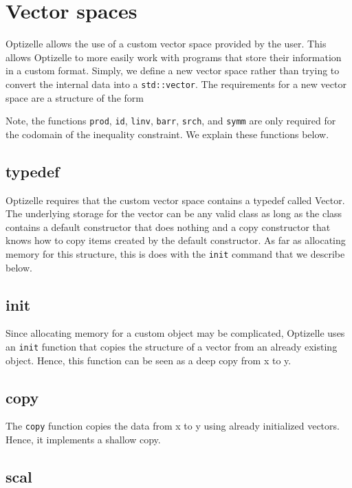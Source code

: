 \documentclass{report}
\newcommand{\seccustomvector}{Vector spaces}
\begin{document}
\section{\seccustomvector}\label{sec:customvector}

        Optizelle allows the use of a custom vector space provided by the user.  This allows Optizelle to more easily work with programs that store their information in a custom format.  Simply, we define a new vector space rather than trying to convert the internal data into a \texttt{std::vector}.  The requirements for a new vector space are a structure of the form

Note, the functions \texttt{prod}, \texttt{id}, \texttt{linv}, \texttt{barr}, \texttt{srch}, and \texttt{symm} are only required for the codomain of the inequality constraint.  We explain these functions below.

\subsection{typedef}

       Optizelle requires that the custom vector space contains a typedef called Vector.  The underlying storage for the vector can be any valid class as long as the class contains a default constructor that does nothing and a copy constructor that knows how to copy items created by the default constructor.  As far as allocating memory for this structure, this is does with the \texttt{init} command that we describe below.

\subsection{init}

        Since allocating memory for a custom object may be complicated, Optizelle uses an \texttt{init} function that copies the structure of a vector from an already existing object.  Hence, this function can be seen as a deep copy from x to y.

\subsection{copy}
        
        The \texttt{copy} function copies the data from x to y using already initialized vectors.  Hence, it implements a shallow copy.

\subsection{scal}
\end{document}
